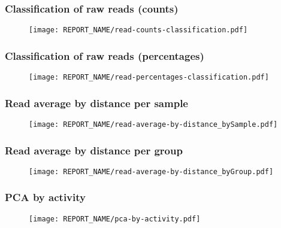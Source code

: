 



\begin{frame}
\frametitle{Classification of raw reads (counts)}
\begin{figure}
\texttt{[image: REPORT\_NAME/read-counts-classification.pdf]}
\end{figure}
\end{frame}


\begin{frame}
\frametitle{Classification of raw reads (percentages)}
\begin{figure}
\texttt{[image: REPORT\_NAME/read-percentages-classification.pdf]}
\end{figure}
\end{frame}

\begin{frame}											%
\frametitle{Read average by distance per sample}						%
\begin{figure}											%
\texttt{[image: REPORT\_NAME/read-average-by-distance\_bySample.pdf]}	%
\end{figure}											%
\end{frame}											%

\begin{frame}											%
\frametitle{Read average by distance per group}							%
\begin{figure}											%
\texttt{[image: REPORT\_NAME/read-average-by-distance\_byGroup.pdf]}		%
\end{figure}											%
\end{frame}											%

												
\begin{frame}											
\frametitle{PCA by activity}									
\begin{figure}											
\texttt{[image: REPORT\_NAME/pca-by-activity.pdf]}			
\end{figure}											
\end{frame}											

